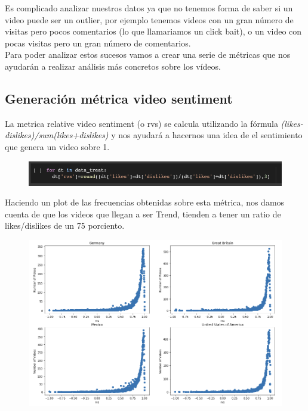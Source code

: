 \documentclass[a4paper,12pt]{article}
\begin{document}
Es complicado analizar nuestros datos ya que no tenemos forma de saber si un video puede ser un outlier, por ejemplo tenemos videos con un gran n\'umero de visitas pero pocos comentarios (lo que llamariamos un click bait), o un video con pocas visitas pero un gran n\'umero de comentarios.
\\
Para poder analizar estos sucesos vamos a crear una serie de m\'etricas que nos ayudar\'an a realizar an\'alisis m\'as concretos sobre los v\'ideos.

\subsection{Generaci\'on m\'etrica video sentiment}
La metrica relative video sentiment (o rvs) se calcula utilizando la f\'ormula {\itshape (likes-dislikes)/sum(likes+dislikes)} y nos ayudar\'a a hacernos una idea de el sentimiento que genera un video sobre 1.

\begin{figure}[h!]
\centering
\includegraphics[width=13cm]{rvs_gen.png}
\end{figure}

Haciendo un plot de las frecuencias obtenidas sobre esta m\'etrica, nos damos cuenta de que los videos que llegan a ser Trend, tienden a tener un ratio de likes/dislikes de un 75 porciento.
\begin{figure}[h!]
\centering
\includegraphics[width=14cm]{rvs_plot.png}
\end{figure}
\end{document}

